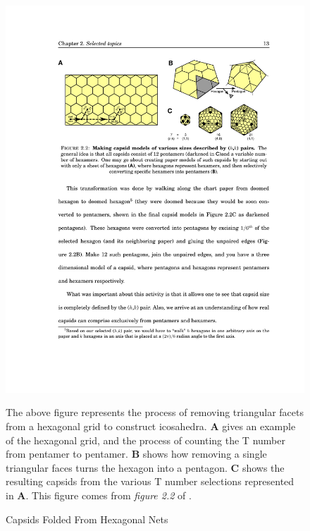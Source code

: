 \documentclass[12pt,letter]{article}
\begin{document}
\begin{figure}[t!]
	\centering
	\caption{Capsids Folded From Hexagonal Nets}
	\includegraphics[width = .9\textwidth]{hex_net.pdf}
	\begin{minipage}[h]{.9\textwidth}
		\begin{footnotesize}
		The above figure represents the process of removing triangular facets from a hexagonal grid to construct icosahedra. \textbf{A} gives an example of the hexagonal grid, and the process of counting the T number from pentamer to pentamer. \textbf{B} shows how removing a single triangular faces turns the hexagon into a pentagon. \textbf{C} shows the resulting capsids from the various T number selections represented in \textbf{A}. This figure comes from \textit{figure 2.2} of \cite{Mannige:Thesis}.
		\end{footnotesize}
	\end{minipage}
	\label{fig:mannige_net}
\end{figure}
\end{document}
